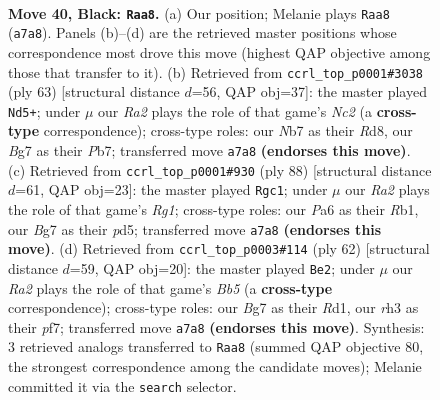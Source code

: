 \documentclass[11pt]{article}
\begin{document}
\clearpage

\begin{figure}[p]\centering
\begin{subfigure}{0.46\textwidth}\centering
\resizebox{\linewidth}{!}{%
\newchessgame
\chessboard[
  setfen={2r5/rn3kbp/p2p2p1/4p1P1/PpP1P2P/1P3PBR/2K3B1/R7 b - - 2 40},
  showmover=false,
  pgfstyle=straightmove, color=movearrow, markmove={a7-a8}
]}
\caption{}
\end{subfigure}\hfill
\begin{subfigure}{0.46\textwidth}\centering
\resizebox{\linewidth}{!}{%
\newchessgame
\chessboard[
  setfen={3r4/1pn1rpkp/2p3p1/p1P5/P1R1P1PP/3PK3/4B3/5R2 b - - 3 32},
  showmover=false,
  pgfstyle=straightmove, color=movearrow, markmove={c7-d5}
]}
\caption{}
\end{subfigure}
\\[4pt]
\begin{subfigure}{0.46\textwidth}\centering
\resizebox{\linewidth}{!}{%
\newchessgame
\chessboard[
  setfen={7r/1p2kp1p/2b1p2P/1p1pPpPB/rP5K/3P4/4P3/1R4R1 w - - 16 45},
  showmover=false,
  pgfstyle=straightmove, color=movearrow, markmove={g1-c1}
]}
\caption{}
\end{subfigure}\hfill
\begin{subfigure}{0.46\textwidth}\centering
\resizebox{\linewidth}{!}{%
\newchessgame
\chessboard[
  setfen={5k1r/2r1pp2/3p1b1p/pB1P3R/Pp3PP1/8/1PP5/1K1R4 w - - 7 32},
  showmover=false,
  pgfstyle=straightmove, color=movearrow, markmove={b5-e2}
]}
\caption{}
\end{subfigure}
\caption{\textbf{Move 40, Black: \texttt{Raa8}.} (a) Our position; Melanie plays \texttt{Raa8} (\texttt{a7a8}). Panels (b)--(d) are the retrieved master positions whose correspondence most drove this move (highest QAP objective among those that transfer to it). (b) Retrieved from \texttt{ccrl\_top\_p0001\#3038} (ply 63) [structural distance $d$=56, QAP obj=37]: the master played \texttt{Nd5+}; under $\mu$ our \emph{Ra2} plays the role of that game's \emph{Nc2} (a \textbf{cross-type} correspondence); cross-type roles: our \emph{N}b7 as their \emph{R}d8, our \emph{B}g7 as their \emph{P}b7; transferred move \texttt{a7a8} \textbf{(endorses this move)}. (c) Retrieved from \texttt{ccrl\_top\_p0001\#930} (ply 88) [structural distance $d$=61, QAP obj=23]: the master played \texttt{Rgc1}; under $\mu$ our \emph{Ra2} plays the role of that game's \emph{Rg1}; cross-type roles: our \emph{P}a6 as their \emph{R}b1, our \emph{B}g7 as their \emph{p}d5; transferred move \texttt{a7a8} \textbf{(endorses this move)}. (d) Retrieved from \texttt{ccrl\_top\_p0003\#114} (ply 62) [structural distance $d$=59, QAP obj=20]: the master played \texttt{Be2}; under $\mu$ our \emph{Ra2} plays the role of that game's \emph{Bb5} (a \textbf{cross-type} correspondence); cross-type roles: our \emph{B}g7 as their \emph{R}d1, our \emph{r}h3 as their \emph{p}f7; transferred move \texttt{a7a8} \textbf{(endorses this move)}. Synthesis: 3 retrieved analogs transferred to \texttt{Raa8} (summed QAP objective 80, the strongest correspondence among the candidate moves); Melanie committed it via the \texttt{search} selector.}
\label{fig:thought-m79}
\end{figure}
\end{document}
